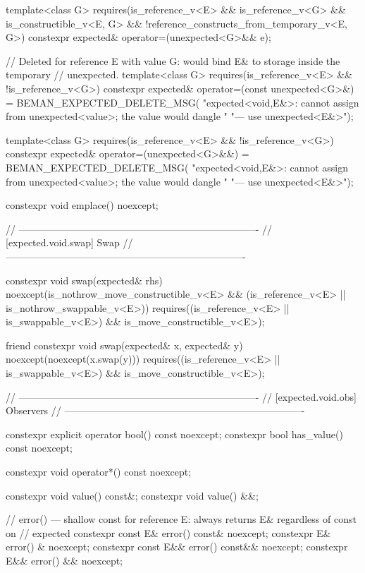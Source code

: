 \begin{codeblock}
{{    template<class G>
      requires(is_reference_v<E> && is_reference_v<G> && is_constructible_v<E, G> &&
               !reference_constructs_from_temporary_v<E, G>)
    constexpr expected& operator=(unexpected<G>&& e);

    // Deleted for reference E with value G: would bind E& to storage inside the temporary
    // unexpected.
    template<class G>
      requires(is_reference_v<E> && !is_reference_v<G>)
    constexpr expected& operator=(const unexpected<G>&) = BEMAN_EXPECTED_DELETE_MSG(
        "expected<void,E&>: cannot assign from unexpected<value>; the value would dangle "
        "— use unexpected<E&>");

    template<class G>
      requires(is_reference_v<E> && !is_reference_v<G>)
    constexpr expected& operator=(unexpected<G>&&) = BEMAN_EXPECTED_DELETE_MSG(
        "expected<void,E&>: cannot assign from unexpected<value>; the value would dangle "
        "— use unexpected<E&>");

    constexpr void emplace() noexcept;

    // -------------------------------------------------------------------------
    // [expected.void.swap] Swap
    // -------------------------------------------------------------------------

    constexpr void swap(expected& rhs) noexcept(is_nothrow_move_constructible_v<E> &&
                                                (is_reference_v<E> ||
                                                 is_nothrow_swappable_v<E>))
      requires((is_reference_v<E> || is_swappable_v<E>) && is_move_constructible_v<E>);

    friend constexpr void swap(expected& x, expected& y) noexcept(noexcept(x.swap(y)))
      requires((is_reference_v<E> || is_swappable_v<E>) && is_move_constructible_v<E>);

    // -------------------------------------------------------------------------
    // [expected.void.obs] Observers
    // -------------------------------------------------------------------------

    constexpr explicit operator bool() const noexcept;
    constexpr bool has_value() const noexcept;

    constexpr void operator*() const noexcept;

    constexpr void value() const&;
    constexpr void value() &&;

    // error() — shallow const for reference E: always returns E& regardless of const on
    // expected
    constexpr const E& error() const& noexcept;
    constexpr E& error() & noexcept;
    constexpr const E&& error() const&& noexcept;
    constexpr E&& error() && noexcept;

}}
\end{codeblock}
